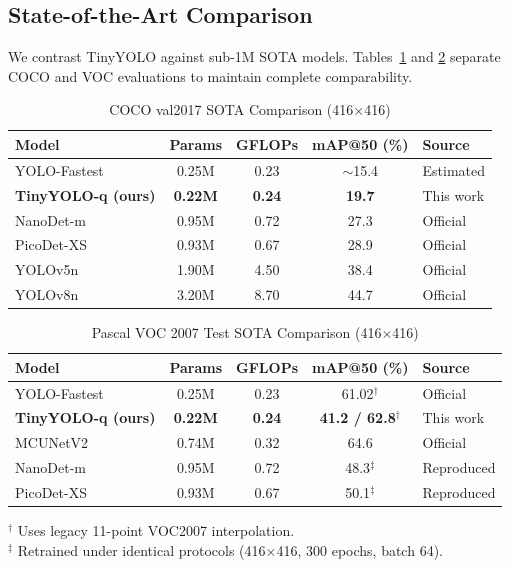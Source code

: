 \documentclass[article,submit,moreauthors,pdftex,10pt,a4paper]{article}
\begin{document}
\subsection{State-of-the-Art Comparison}
We contrast TinyYOLO against sub-1M SOTA models. Tables~\ref{tab:sota_coco} and \ref{tab:sota_voc} separate COCO and VOC evaluations to maintain complete comparability.

\begin{table}[h]
\centering
\caption{COCO val2017 SOTA Comparison (416$\times$416)}
\label{tab:sota_coco}
\begin{tabular}{lcccl}
\toprule
Model & Params & GFLOPs & mAP@50 (\%) & Source \\
\midrule
YOLO-Fastest \cite{wu2021yolofastest} & 0.25M & 0.23 & $\sim$15.4 & Estimated \\
\textbf{TinyYOLO-q (ours)} & \textbf{0.22M} & \textbf{0.24} & \textbf{19.7} & This work \\
NanoDet-m \cite{lyu2020nanodet} & 0.95M & 0.72 & 27.3 & Official \\
PicoDet-XS \cite{yu2021picodet} & 0.93M & 0.67 & 28.9 & Official \\
YOLOv5n \cite{jocher2020yolov5} & 1.90M & 4.50 & 38.4 & Official \\
YOLOv8n \cite{jocher2023yolov8} & 3.20M & 8.70 & 44.7 & Official \\
\bottomrule
\end{tabular}
\end{table}

\begin{table}[h]
\centering
\caption{Pascal VOC 2007 Test SOTA Comparison (416$\times$416)}
\label{tab:sota_voc}
\begin{tabular}{lcccl}
\toprule
Model & Params & GFLOPs & mAP@50 (\%) & Source \\
\midrule
YOLO-Fastest \cite{wu2021yolofastest} & 0.25M & 0.23 & 61.02$^\dagger$ & Official \\
\textbf{TinyYOLO-q (ours)} & \textbf{0.22M} & \textbf{0.24} & \textbf{41.2 / 62.8$^\dagger$} & This work \\
MCUNetV2 \cite{lin2021mcunetv2} & 0.74M & 0.32 & 64.6 & Official \\
NanoDet-m \cite{lyu2020nanodet} & 0.95M & 0.72 & 48.3$^\ddagger$ & Reproduced \\
PicoDet-XS \cite{yu2021picodet} & 0.93M & 0.67 & 50.1$^\ddagger$ & Reproduced \\
\bottomrule
\end{tabular}
\vskip 2pt
\begin{flushleft}
\scriptsize $^\dagger$ Uses legacy 11-point VOC2007 interpolation.\\
$^\ddagger$ Retrained under identical protocols (416$\times$416, 300 epochs, batch 64).
\end{flushleft}
\end{table}
\end{document}
